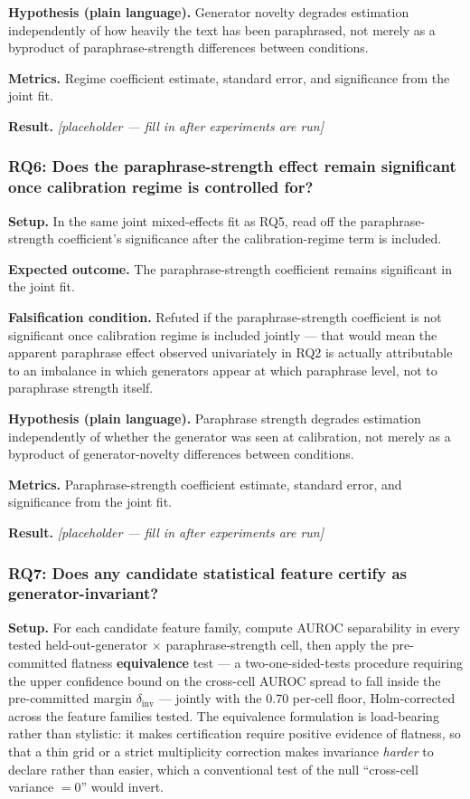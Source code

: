 \documentclass[11pt]{article}
\newcommand{\ph}{\textit{[placeholder --- fill in after experiments are run]}}
\begin{document}
\textbf{Hypothesis (plain language).} Generator novelty degrades estimation independently of how heavily the text has been paraphrased, not merely as a byproduct of paraphrase-strength differences between conditions.

\textbf{Metrics.} Regime coefficient estimate, standard error, and significance from the joint fit.

\textbf{Result.} \ph

\subsubsection{RQ6: Does the paraphrase-strength effect remain significant once calibration regime is controlled for?}
\textbf{Setup.} In the same joint mixed-effects fit as RQ5, read off the paraphrase-strength coefficient's significance after the calibration-regime term is included.

\textbf{Expected outcome.} The paraphrase-strength coefficient remains significant in the joint fit.

\textbf{Falsification condition.} Refuted if the paraphrase-strength coefficient is not significant once calibration regime is included jointly --- that would mean the apparent paraphrase effect observed univariately in RQ2 is actually attributable to an imbalance in which generators appear at which paraphrase level, not to paraphrase strength itself.

\textbf{Hypothesis (plain language).} Paraphrase strength degrades estimation independently of whether the generator was seen at calibration, not merely as a byproduct of generator-novelty differences between conditions.

\textbf{Metrics.} Paraphrase-strength coefficient estimate, standard error, and significance from the joint fit.

\textbf{Result.} \ph

\subsubsection{RQ7: Does any candidate statistical feature certify as generator-invariant?}
\textbf{Setup.} For each candidate feature family, compute AUROC separability in every tested held-out-generator $\times$ paraphrase-strength cell, then apply the pre-committed flatness \textbf{equivalence} test --- a two-one-sided-tests procedure requiring the upper confidence bound on the cross-cell AUROC spread to fall inside the pre-committed margin $\delta_{\text{inv}}$ --- jointly with the 0.70 per-cell floor, Holm-corrected across the feature families tested. The equivalence formulation is load-bearing rather than stylistic: it makes certification require positive evidence of flatness, so that a thin grid or a strict multiplicity correction makes invariance \emph{harder} to declare rather than easier, which a conventional test of the null ``cross-cell variance $=0$'' would invert.
\end{document}
